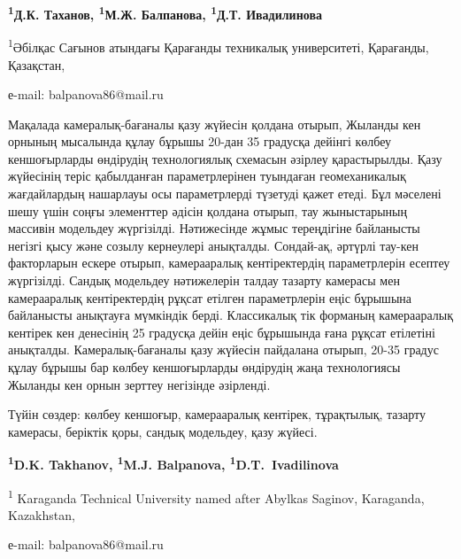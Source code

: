 \begin{center}
{\bfseries \textsuperscript{1}Д.К. Таханов, \textsuperscript{1}М.Ж.
Балпанова\envelope, \textsuperscript{1}Д.Т. Ивадилинова}

\textsuperscript{1}Әбілқас Сағынов атындағы Қарағанды техникалық
университеті, Қарағанды, Қазақстан,

е-mail: balpanova86@mail.ru
\end{center}

Мақалада камералық-бағаналы қазу жүйесін қолдана отырып, Жыланды кен
орнының мысалында құлау бұрышы 20-дан 35 градусқа дейінгі көлбеу
кеншоғырларды өндірудің технологиялық схемасын әзірлеу қарастырылды.
Қазу жүйесінің теріс қабылданған параметрлерінен туындаған
геомеханикалық жағдайлардың нашарлауы осы параметрлерді түзетуді қажет
етеді. Бұл мәселені шешу үшін соңғы элементтер әдісін қолдана отырып,
тау жыныстарының массивін модельдеу жүргізілді. Нәтижесінде жұмыс
тереңдігіне байланысты негізгі қысу және созылу кернеулері анықталды.
Сондай-ақ, әртүрлі тау-кен факторларын ескере отырып, камерааралық
кентіректердің параметрлерін есептеу жүргізілді. Сандық модельдеу
нәтижелерін талдау тазарту камерасы мен камерааралық кентіректердің
рұқсат етілген параметрлерін еңіс бұрышына байланысты анықтауға
мүмкіндік берді. Классикалық тік форманың камерааралық кентірек кен
денесінің 25 градусқа дейін еңіс бұрышында ғана рұқсат етілетіні
анықталды. Камералық-бағаналы қазу жүйесін пайдалана отырып, 20-35
градус құлау бұрышы бар көлбеу кеншоғырларды өндірудің жаңа технологиясы
Жыланды кен орнын зерттеу негізінде әзірленді.

Түйін сөздер: көлбеу кеншоғыр, камерааралық кентірек, тұрақтылық,
тазарту камерасы, беріктік қоры, сандық модельдеу, қазу жүйесі.


\begin{center}
{\bfseries \textsuperscript{1}D.K. Takhanov, \textsuperscript{1}M.J.
Balpanova\envelope, \textsuperscript{1}D.T.~Ivadilinova}

\textsuperscript{1} Karaganda Technical University named after Abylkas
Saginov, Karaganda, Kazakhstan,

е-mail: balpanova86@mail.ru
\end{center}

